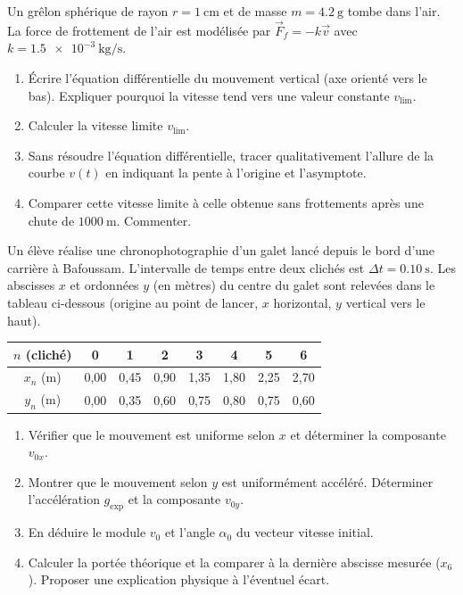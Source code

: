 \documentclass[11pt]{article}
\begin{document}
\begin{exercice}
Un grêlon sphérique de rayon $r = \SI{1}{\centi\meter}$ et de masse $m = \SI{4,2}{\gram}$ tombe dans l'air. La force de frottement de l'air est modélisée par $\vec{F}_f = -k \vec{v}$ avec $k = \SI{1,5e-3}{\kilogram\per\second}$.
\begin{enumerate}
    \item Écrire l'équation différentielle du mouvement vertical (axe orienté vers le bas). Expliquer pourquoi la vitesse tend vers une valeur constante $v_{\text{lim}}$.
    \item Calculer la vitesse limite $v_{\text{lim}}$.
    \item Sans résoudre l'équation différentielle, tracer qualitativement l'allure de la courbe $v(t)$ en indiquant la pente à l'origine et l'asymptote.
    \item Comparer cette vitesse limite à celle obtenue sans frottements après une chute de $\SI{1000}{\meter}$. Commenter.
\end{enumerate}
\end{exercice}

\begin{exercice}
Un élève réalise une chronophotographie d'un galet lancé depuis le bord d'une carrière à Bafoussam. L'intervalle de temps entre deux clichés est $\Delta t = \SI{0,10}{\second}$. Les abscisses $x$ et ordonnées $y$ (en mètres) du centre du galet sont relevées dans le tableau ci-dessous (origine au point de lancer, $x$ horizontal, $y$ vertical vers le haut).

\begin{tabular}{c|ccccccc}
$n$ (cliché) & 0 & 1 & 2 & 3 & 4 & 5 & 6 \\ \hline
$x_n$ (m)   & 0,00 & 0,45 & 0,90 & 1,35 & 1,80 & 2,25 & 2,70 \\
$y_n$ (m)   & 0,00 & 0,35 & 0,60 & 0,75 & 0,80 & 0,75 & 0,60
\end{tabular}

\begin{enumerate}
    \item Vérifier que le mouvement est uniforme selon $x$ et déterminer la composante $v_{0x}$.
    \item Montrer que le mouvement selon $y$ est uniformément accéléré. Déterminer l'accélération $g_{\text{exp}}$ et la composante $v_{0y}$.
    \item En déduire le module $v_0$ et l'angle $\alpha_0$ du vecteur vitesse initial.
    \item Calculer la portée théorique et la comparer à la dernière abscisse mesurée ($x_6$). Proposer une explication physique à l'éventuel écart.
\end{enumerate}
\end{exercice}
\end{document}
